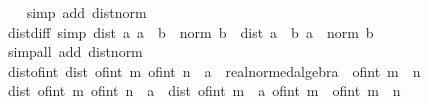 \begin{isabellebody}
%
\isadelimproof
\ \ %
\endisadelimproof
%
\isatagproof
{}\isamarkupfalse%
\ {\isacharparenleft}{\kern0pt}simp\ add{\isacharcolon}{\kern0pt}\ dist{\isacharunderscore}{\kern0pt}norm{\isacharparenright}{\kern0pt}%
\endisatagproof
{\isafoldproof}%
%
\isadelimproof
\isanewline
%
\endisadelimproof
\isanewline
{}\isamarkupfalse%
\ dist{\isacharunderscore}{\kern0pt}diff\ {\isacharbrackleft}{\kern0pt}simp{\isacharbrackright}{\kern0pt}{\isacharcolon}{\kern0pt}\ {\isachardoublequoteopen}dist\ a\ {\isacharparenleft}{\kern0pt}a\ {\isacharminus}{\kern0pt}\ b{\isacharparenright}{\kern0pt}\ {\isacharequal}{\kern0pt}\ norm\ b{\isachardoublequoteclose}\ \ {\isachardoublequoteopen}dist\ {\isacharparenleft}{\kern0pt}a\ {\isacharminus}{\kern0pt}\ b{\isacharparenright}{\kern0pt}\ a\ {\isacharequal}{\kern0pt}\ norm\ b{\isachardoublequoteclose}\isanewline
%
\isadelimproof
\ \ %
\endisadelimproof
%
\isatagproof
{}\isamarkupfalse%
\ {\isacharparenleft}{\kern0pt}simp{\isacharunderscore}{\kern0pt}all\ add{\isacharcolon}{\kern0pt}\ dist{\isacharunderscore}{\kern0pt}norm{\isacharparenright}{\kern0pt}%
\endisatagproof
{\isafoldproof}%
%
\isadelimproof
\isanewline
%
\endisadelimproof
\isanewline
{}\isamarkupfalse%
\ dist{\isacharunderscore}{\kern0pt}of{\isacharunderscore}{\kern0pt}int{\isacharcolon}{\kern0pt}\ {\isachardoublequoteopen}dist\ {\isacharparenleft}{\kern0pt}of{\isacharunderscore}{\kern0pt}int\ m{\isacharparenright}{\kern0pt}\ {\isacharparenleft}{\kern0pt}of{\isacharunderscore}{\kern0pt}int\ n\ {\isacharcolon}{\kern0pt}{\isacharcolon}{\kern0pt}\ {\isacharprime}{\kern0pt}a\ {\isacharcolon}{\kern0pt}{\isacharcolon}{\kern0pt}\ real{\isacharunderscore}{\kern0pt}normed{\isacharunderscore}{\kern0pt}algebra{\isacharunderscore}{\kern0pt}{}{\isacharparenright}{\kern0pt}\ {\isacharequal}{\kern0pt}\ of{\isacharunderscore}{\kern0pt}int\ {\isasymbar}m\ {\isacharminus}{\kern0pt}\ n{\isasymbar}{\isachardoublequoteclose}\isanewline
%
\isadelimproof
%
\endisadelimproof
%
\isatagproof
{}\isamarkupfalse%
\ {\isacharminus}{\kern0pt}\isanewline
\ \ \isamarkupfalse%
\ {\isachardoublequoteopen}dist\ {\isacharparenleft}{\kern0pt}of{\isacharunderscore}{\kern0pt}int\ m{\isacharparenright}{\kern0pt}\ {\isacharparenleft}{\kern0pt}of{\isacharunderscore}{\kern0pt}int\ n\ {\isacharcolon}{\kern0pt}{\isacharcolon}{\kern0pt}\ {\isacharprime}{\kern0pt}a{\isacharparenright}{\kern0pt}\ {\isacharequal}{\kern0pt}\ dist\ {\isacharparenleft}{\kern0pt}of{\isacharunderscore}{\kern0pt}int\ m\ {\isacharcolon}{\kern0pt}{\isacharcolon}{\kern0pt}\ {\isacharprime}{\kern0pt}a{\isacharparenright}{\kern0pt}\ {\isacharparenleft}{\kern0pt}of{\isacharunderscore}{\kern0pt}int\ m\ {\isacharminus}{\kern0pt}\ {\isacharparenleft}{\kern0pt}of{\isacharunderscore}{\kern0pt}int\ {\isacharparenleft}{\kern0pt}m\ {\isacharminus}{\kern0pt}\ n{\isacharparenright}{\kern0pt}{\isacharparenright}{\kern0pt}{\isacharparenright}{\kern0pt}{\isachardoublequoteclose}\isanewline

\end{isabellebody}
